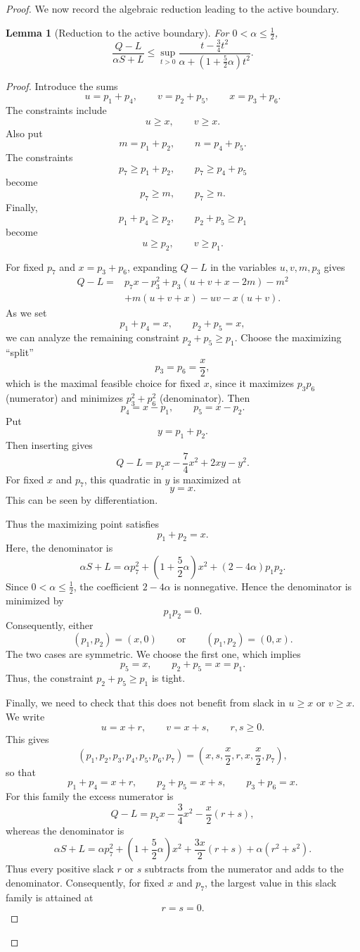 \documentclass[11pt]{article}
\newtheorem{lemma}{Lemma}
\begin{document}
\begin{proof}
We now record the algebraic reduction leading to the active boundary.

\begin{lemma}[Reduction to the active boundary]
For \(0<\alpha\le \frac12\),
\[
\frac{Q-L}{\alpha S+L}
\le
\sup_{t>0}
\frac{t-\frac34t^2}
{\alpha+\left(1+\frac52\alpha\right)t^2}.
\]
\end{lemma}

\begin{proof}
Introduce the sums
\[
u=p_1+p_4,\qquad v=p_2+p_5,\qquad x=p_3+p_6.
\]
The constraints include
\[
u\ge x,\qquad v\ge x.
\]
Also put
\[
m=p_1+p_2,\qquad n=p_4+p_5.
\]
The constraints
\[
p_7\ge p_1+p_2,\qquad p_7\ge p_4+p_5
\]
become
\[
p_7\ge m,\qquad p_7\ge n.
\]
Finally,
\[
p_1+p_4\ge p_2,\qquad p_2+p_5\ge p_1
\]
become
\[
u\ge p_2,\qquad v\ge p_1.
\]

For fixed \(p_7\) and \(x=p_3+p_6\), expanding \(Q-L\) in the variables
\(u,v,m,p_3\) gives
\[
\begin{aligned}
Q-L
={}&p_7x-p_3^2+p_3(u+v+x-2m)-m^2\\
&+m(u+v+x)-uv-x(u+v).
\end{aligned}
\]
As we set
\[
p_1+p_4=x,\qquad p_2+p_5=x,
\]
we can analyze the remaining constraint \(p_2+p_5\ge p_1\). Choose the
maximizing ``split''
\[
p_3=p_6=\frac{x}{2},
\]
which is the maximal feasible choice for fixed \(x\), since it maximizes
\(p_3p_6\) (numerator) and minimizes \(p_3^2+p_6^2\) (denominator).
Then
\[
p_4=x-p_1,\qquad p_5=x-p_2.
\]
Put
\[
y=p_1+p_2.
\]
Then inserting gives
\[
Q-L
=
p_7x-\frac74x^2+2xy-y^2.
\]
For fixed \(x\) and \(p_7\), this quadratic in \(y\) is maximized at
\[
y=x.
\]
This can be seen by differentiation.

Thus the maximizing point satisfies
\[
p_1+p_2=x.
\]
Here, the denominator is
\[
\alpha S+L
=
\alpha p_7^2
+\left(1+\frac52\alpha\right)x^2
+(2-4\alpha)p_1p_2.
\]
Since \(0<\alpha\le \frac12\), the coefficient \(2-4\alpha\) is
nonnegative. Hence the denominator is minimized by
\[
p_1p_2=0.
\]
Consequently, either
\[
(p_1,p_2)=(x,0)
\qquad\text{or}\qquad
(p_1,p_2)=(0,x).
\]
The two cases are symmetric. We choose the first one, which implies
\[
p_5=x,\qquad p_2+p_5=x=p_1.
\]
Thus, the constraint
\(p_2+p_5\ge p_1\) is tight.

Finally, we need to check that this does not benefit from slack in
\(u\ge x\) or \(v\ge x\). We write
\[
u=x+r,\qquad v=x+s,\qquad r,s\ge0.
\]
This gives
\[
(p_1,p_2,p_3,p_4,p_5,p_6,p_7)
=
\left(x,s,\frac{x}{2},r,x,\frac{x}{2},p_7\right),
\]
so that
\[
p_1+p_4=x+r,\qquad
p_2+p_5=x+s,\qquad
p_3+p_6=x.
\]
For this family the excess numerator is
\[
Q-L
=
p_7x-\frac34x^2-\frac{x}{2}(r+s),
\]
whereas the denominator is
\[
\alpha S+L
=
\alpha p_7^2
+\left(1+\frac52\alpha\right)x^2
+\frac{3x}{2}(r+s)
+\alpha(r^2+s^2).
\]
Thus every positive slack \(r\) or \(s\) subtracts from the numerator
and adds to the denominator. Consequently, for fixed \(x\) and \(p_7\),
the largest value in this slack family is attained at
\[
r=s=0.
\]


\end{proof}
\end{proof}
\end{document}
